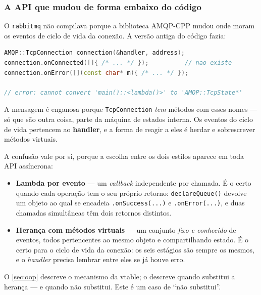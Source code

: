 \subsubsection{A API que mudou de forma embaixo do código}

O \texttt{rabbitmq} não compilava porque a biblioteca AMQP-CPP mudou onde moram
os eventos de ciclo de vida da conexão. A versão antiga do código fazia:

\begin{lstlisting}[style=bt, language=C++, caption={A forma que não existe mais,
    e a mensagem de erro que ela produz --- resumo de
    \texttt{src/rabbitmq/handler.hpp}.}]
AMQP::TcpConnection connection(&handler, address);
connection.onConnected([]{ /* ... */ });          // nao existe
connection.onError([](const char* m){ /* ... */ });

// error: cannot convert 'main()::<lambda()>' to 'AMQP::TcpState*'
\end{lstlisting}

A mensagem é enganosa porque \texttt{TcpConnection} \emph{tem} métodos com esses
nomes --- só que são outra coisa, parte da máquina de estados interna. Os
eventos do ciclo de vida pertencem ao \textbf{handler}, e a forma de reagir a
eles é herdar e sobrescrever métodos virtuais.

\begin{porque}
A confusão vale por si, porque a escolha entre os dois estilos aparece em toda
API assíncrona:

\begin{itemize}
    \item \textbf{Lambda por evento} --- um \emph{callback} independente por
          chamada. É o certo quando cada operação tem o seu próprio retorno:
          \texttt{declareQueue()} devolve um objeto ao qual se encadeia
          \texttt{.onSuccess(...)} e \texttt{.onError(...)}, e duas chamadas
          simultâneas têm dois retornos distintos.
    \item \textbf{Herança com métodos virtuais} --- um conjunto \emph{fixo e
          conhecido} de eventos, todos pertencentes ao mesmo objeto e
          compartilhando estado. É o certo para o ciclo de vida da conexão: os
          seis estágios são sempre os mesmos, e o \emph{handler} precisa
          lembrar entre eles se já houve erro.
\end{itemize}

O \cref{sec:oop} descreve o mecanismo da \gls{vtable}; o 
descreve quando  substitui a herança --- e quando não
substitui. Este é um caso de ``não substitui''.
\end{porque}

